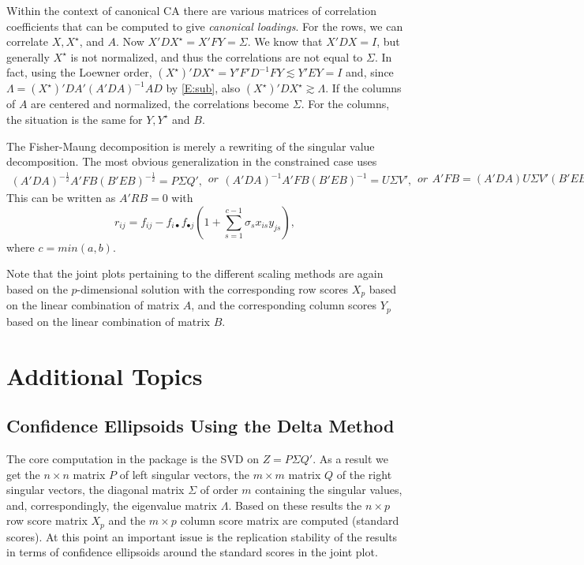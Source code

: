 \documentclass[article]{Z}
\begin{document}
Within the context of canonical CA there are various matrices of correlation coefficients that can be computed
to give \emph{canonical loadings}. For the rows, we can correlate \(X,X^\star\),
and \(A\). Now \(X'DX^\star=X'FY=\Sigma\). We know that \(X'DX=I\), but
generally \(X^\star\) is not normalized, and thus the correlations are not equal to
\(\Sigma\). In fact, using the Loewner order, \((X^\star)'DX^\star=Y'F'D^{-1}FY\lesssim Y'EY=I\) and, since
\(\Lambda=(X^\star)'DA'(A'DA)^{-1}AD\) by \ref{E:sub}, also \((X^\star)'DX^\star\gtrsim\Lambda\). If the columns of \(A\) are centered and normalized, the correlations become $\Sigma$. For the columns, the situation is the same for \(Y,Y^\star\) and \(B\).

The Fisher-Maung decomposition is merely a rewriting of the singular value
decomposition. The most obvious generalization in the constrained case uses
\begin{subequations}
\begin{align}
(A'DA)^{-\frac12}A'FB(B'EB)^{-\frac12}=P\Sigma Q',
\end{align}
or
\begin{align}
(A'DA)^{-1}A'FB(B'EB)^{-1}=U\Sigma V',
\end{align}
or
\begin{align}
A'FB=(A'DA)U\Sigma V'(B'EB)=A'(DX\Sigma Y'E)B.
\end{align}
\end{subequations}
This can be written as \(A'RB=0\) with
\begin{equation}
r_{ij}=f_{ij}-f_{i\bullet}f_{\bullet j}(1+\sum_{s=1}^{c-1}\sigma_sx_{is}y_{js}),
\end{equation}
where $c=min(a,b)$. 

Note that the joint plots pertaining to the different scaling methods are again based on the $p$-dimensional solution with the corresponding row scores $X_p$ based on the linear combination of matrix $A$, and the corresponding column scores $Y_p$ based on the linear combination of matrix $B$. 


\section{Additional Topics}
\subsection{Confidence Ellipsoids Using the Delta Method}
The core computation in the  package is the SVD on $Z=P\Sigma Q'$. As a result we get the $n \times n$ matrix $P$ of left singular vectors, the $m \times m$ matrix $Q$ of the right singular vectors, the diagonal matrix $\Sigma$ of order $m$ containing the singular values, and, correspondingly, the eigenvalue matrix $\Lambda$. Based on these results the $n \times p$ row score matrix $X_p$ and the $m \times p$ column score matrix are computed (standard scores). At this point an important issue is the replication stability of the results in terms of confidence ellipsoids around the standard scores in the joint plot. 
\end{document}
